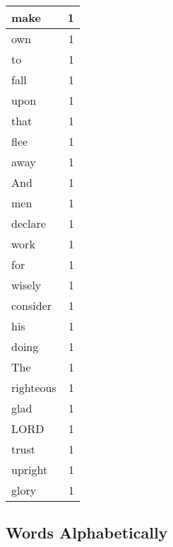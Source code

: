 \begin{center}
\begin{longtable}{l|r}
make & 1 \\ \hline
own & 1 \\ \hline
to & 1 \\ \hline
fall & 1 \\ \hline
upon & 1 \\ \hline
that & 1 \\ \hline
flee & 1 \\ \hline
away & 1 \\ \hline
And & 1 \\ \hline
men & 1 \\ \hline
declare & 1 \\ \hline
work & 1 \\ \hline
for & 1 \\ \hline
wisely & 1 \\ \hline
consider & 1 \\ \hline
his & 1 \\ \hline
doing & 1 \\ \hline
The & 1 \\ \hline
righteous & 1 \\ \hline
glad & 1 \\ \hline
LORD & 1 \\ \hline
trust & 1 \\ \hline
upright & 1 \\ \hline
glory & 1 \\ \hline
\end{longtable}
\end{center}



\normalsize



\subsection{Words Alphabetically}


